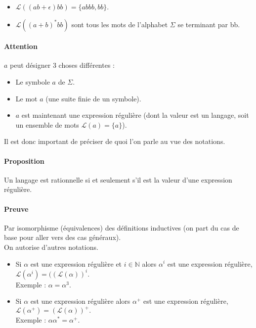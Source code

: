 \begin{itemize}
	\item $\mathcal{L}((ab + \epsilon)bb)=\{abbb , bb\}$.
	\item $\mathcal{L}((a + b)^*bb)$ sont tous les mots de l'alphabet $\Sigma$ se terminant par bb.
\end{itemize}



\paragraph{Attention} %
\label{par:attention}

$a$ peut désigner 3 choses différentes :
\begin{itemize}
	\item Le symbole $a$ de $\Sigma$.
	\item Le mot $a$ (une suite finie de un symbole).
	\item $a$ est maintenant une expression régulière (dont la valeur est un langage, soit un ensemble de mots $\mathcal{L}(a)=\{a\}$).
\end{itemize}
Il est donc important de préciser de quoi l'on parle au vue des notations.



\paragraph{Proposition} %
\label{par:proposition}

Un langage est rationnelle si et seulement s'il est la valeur d'une expression régulière.



\paragraph{Preuve} %
\label{par:preuve}

Par isomorphisme (équivalences) des définitions inductives (on part du cas de base pour aller vers des cas généraux).\\


On autorise d'autres notations.

\begin{itemize}
	\item Si $\alpha$ est une expression régulière et $i \in \mathbb{N}$ alors $\alpha^i$ est une expression régulière, $\mathcal{L}(\alpha^i)=((\mathcal{L}(\alpha))^i$.\\
	Exemple : $\alpha=\alpha^3$.
	\item Si $\alpha$ est une expression régulière alors $\alpha^+$ est une expression régulière, $\mathcal{L}(\alpha^+)=(\mathcal{L}(\alpha))^+.$\\
	Exemple : $\alpha\alpha^*=\alpha^+$.
\end{itemize}


